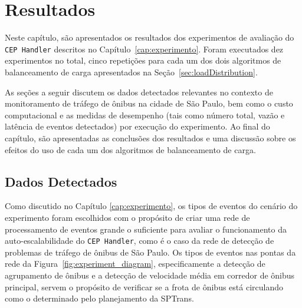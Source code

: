 \chapter{Resultados}
\label{cap:resultados}

Neste capítulo, são apresentados os resultados dos experimentos de avaliação do \texttt{CEP Handler} descritos no Capítulo~\ref{cap:experimento}. Foram executados dez experimentos no total, cinco repetições para cada um dos dois algoritmos de balanceamento de carga apresentados na Seção~\ref{sec:loadDistribution}. 

As seções a seguir discutem os dados detectados relevantes no contexto de monitoramento de tráfego de ônibus na cidade de São Paulo, bem como o custo computacional e as medidas de desempenho (tais como número total, vazão e latência de eventos detectados) por execução do experimento. 
Ao final do capítulo, são apresentadas as conclusões dos resultados e uma discussão sobre os efeitos do uso de cada um dos algoritmos de balanceamento de carga. 

\section{Dados Detectados}

Como discutido no Capítulo \ref{cap:experimento}, os tipos de eventos do cenário do experimento foram escolhidos com o propósito de criar uma rede de processamento de eventos grande o suficiente para avaliar o funcionamento da auto-escalabilidade do \texttt{CEP Handler}, como é o caso da rede de detecção de problemas de tráfego de ônibus de São Paulo.
Os tipos de eventos nas pontas da rede da Figura~\ref{fig:experiment_diagram}, especificamente a detecção de agrupamento de ônibus e a detecção de velocidade média em corredor de ônibus principal, servem o propósito de verificar se a frota de ônibus está circulando como o determinado pelo planejamento da SPTrans. 

